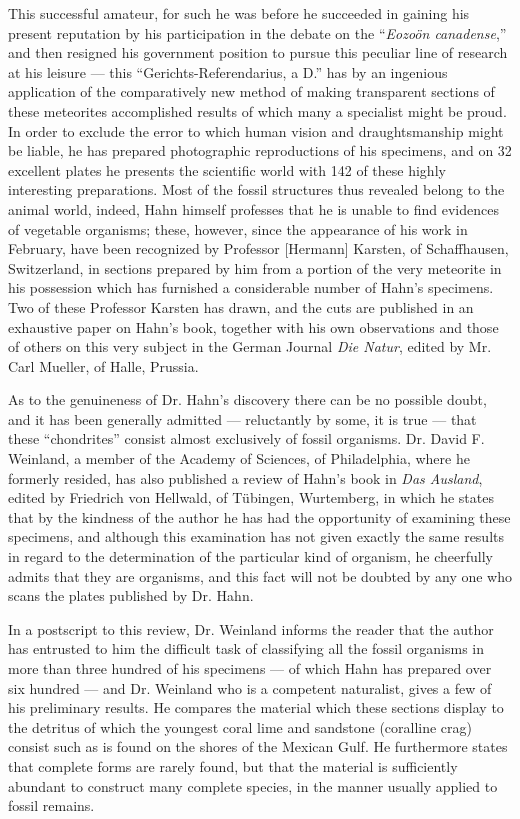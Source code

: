 \documentclass[a4paper, 12pt, oneside]{article}
\begin{document}
This successful amateur, for such he was before he succeeded in gaining his present reputation by his participation in the debate on the ``\emph{Eozoön canadense},'' and then resigned his government position to pursue this peculiar line of research at his leisure --- this ``Gerichts-Referendarius, a D.'' has by an ingenious application of the comparatively new method of making transparent sections of these meteorites accomplished results of which many a specialist might be proud. In order to exclude the error to which human vision and draughtsmanship might be liable, he has prepared photographic reproductions of his specimens, and on 32 excellent plates he presents the scientific world with 142 of these highly interesting preparations. Most of the fossil structures thus revealed belong to the animal world, indeed, Hahn himself professes that he is unable to find evidences of vegetable organisms; these, however, since the appearance of his work in February, have been recognized by Professor [Hermann] Karsten, of Schaffhausen, Switzerland, in sections prepared by him from a portion of the very meteorite in his possession which has furnished a considerable number of Hahn's specimens. Two of these Professor Karsten has drawn, and the cuts are published in an exhaustive paper on Hahn's book, together with his own observations and those of others on this very subject in the German Journal \emph{Die Natur}, edited by Mr. Carl Mueller, of Halle, Prussia.

As to the genuineness of Dr. Hahn's discovery there can be no possible doubt, and it has been generally admitted --- reluctantly by some, it is true --- that these ``chondrites'' consist almost exclusively of fossil organisms. Dr. David F. Weinland, a member of the Academy of Sciences, of Philadelphia, where he formerly resided, has also published a review of Hahn's book in \emph{Das Ausland}, edited by Friedrich von Hellwald, of Tübingen, Wurtemberg, in which he states that by the kindness of the author he has had the opportunity of examining these specimens, and although this examination has not given exactly the same results in regard to the determination of the particular kind of organism, he cheerfully admits that they are organisms, and this fact will not be doubted by any one who scans the plates published by Dr. Hahn.

In a postscript to this review, Dr. Weinland informs the reader that the author has entrusted to him the difficult task of classifying all the fossil organisms in more than three hundred of his specimens --- of which Hahn has prepared over six hundred --- and Dr. Weinland who is a competent naturalist, gives a few of his preliminary results. He compares the material which these sections display to the detritus of which the youngest coral lime and sandstone (coralline crag) consist such as is found on the shores of the Mexican Gulf. He furthermore states that complete forms are rarely found, but that the material is sufficiently abundant to construct many complete species, in the manner usually applied to fossil remains. 
\end{document}
